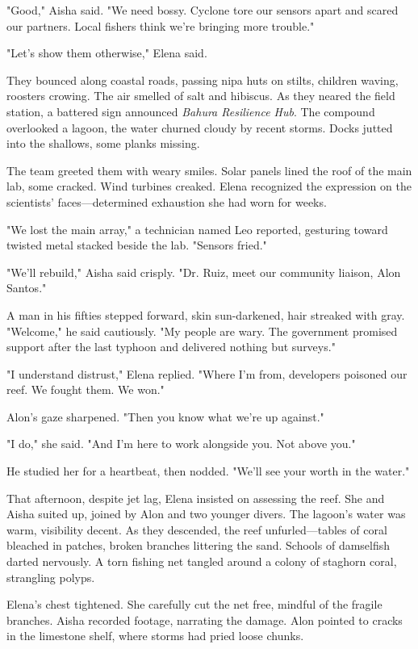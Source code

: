 "Good," Aisha said. "We need bossy. Cyclone tore our sensors apart and scared our partners. Local fishers think we're bringing more trouble."

"Let's show them otherwise," Elena said.

They bounced along coastal roads, passing nipa huts on stilts, children waving, roosters crowing. The air smelled of salt and hibiscus. As they neared the field station, a battered sign announced \textit{Bahura Resilience Hub}. The compound overlooked a lagoon, the water churned cloudy by recent storms. Docks jutted into the shallows, some planks missing.

The team greeted them with weary smiles. Solar panels lined the roof of the main lab, some cracked. Wind turbines creaked. Elena recognized the expression on the scientists' faces—determined exhaustion she had worn for weeks.

"We lost the main array," a technician named Leo reported, gesturing toward twisted metal stacked beside the lab. "Sensors fried."

"We'll rebuild," Aisha said crisply. "Dr. Ruiz, meet our community liaison, Alon Santos."

A man in his fifties stepped forward, skin sun-darkened, hair streaked with gray. "Welcome," he said cautiously. "My people are wary. The government promised support after the last typhoon and delivered nothing but surveys."

"I understand distrust," Elena replied. "Where I'm from, developers poisoned our reef. We fought them. We won."

Alon's gaze sharpened. "Then you know what we're up against."

"I do," she said. "And I'm here to work alongside you. Not above you."

He studied her for a heartbeat, then nodded. "We'll see your worth in the water."

\bigskip

That afternoon, despite jet lag, Elena insisted on assessing the reef. She and Aisha suited up, joined by Alon and two younger divers. The lagoon's water was warm, visibility decent. As they descended, the reef unfurled—tables of coral bleached in patches, broken branches littering the sand. Schools of damselfish darted nervously. A torn fishing net tangled around a colony of staghorn coral, strangling polyps.

Elena's chest tightened. She carefully cut the net free, mindful of the fragile branches. Aisha recorded footage, narrating the damage. Alon pointed to cracks in the limestone shelf, where storms had pried loose chunks.

